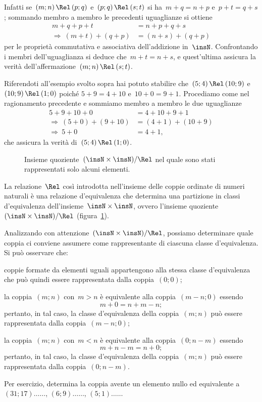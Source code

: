 Infatti se~$(m;n)\,\Rel\,(p;q)$ e~$(p;q)\,\Rel\,(s;t)$ si ha~$m+q = n+p$ e~$p+t = q+s$; sommando membro a membro le precedenti
uguaglianze si ottiene
\begin{align*}
 m+q + p+t &= n+p + q+s\\
 \Rightarrow\: (m+t)+(q+p) &= (n+s)+(q+p)
\end{align*}
per le proprietà commutativa e associativa dell'addizione in~$\insN$. Confrontando i membri dell'uguaglianza si deduce che~$m+t = n+s$,
e quest'ultima assicura la verità dell'affermazione~$(m;n)\,\Rel\,(s;t)$.

Riferendoti all'esempio svolto sopra hai potuto stabilire che~$(5;4)\,\Rel\,(10;9)$ e~$(10;9)\,\Rel \,(1;0)$
poiché $5+9=4+10$ e~$10+0=9+1$. Procediamo come nel ragionamento precedente e sommiamo membro a membro le due uguaglianze
\begin{align*}
 5+9+10+0 &= 4+10+9+1\\
\Rightarrow\: (5+0)+(9+10) &= (4+1)+(10+9)\\
\Rightarrow\: 5+0 &= 4+1\text{,}
\end{align*}
che assicura la verità di~$(5;4)\,\Rel\,(1;0)$.%

\begin{figure}[t]
 \centering
 \caption{Insieme quoziente~$(\insN\times\insN)/\Rel$ nel quale sono stati rappresentati solo alcuni elementi.}\label{fig:E.2}
\end{figure}

\conclusione La relazione~$\Rel$ così introdotta nell'insieme delle coppie ordinate di numeri naturali è una relazione d'equivalenza che determina
una partizione in classi d'equivalenza dell'insieme~$\insN\times\insN$, ovvero l'insieme quoziente $(\insN\times\insN)/\Rel$ (figura~\ref{fig:E.2}).

Analizzando con attenzione~$(\insN\times\insN)/\Rel$, possiamo determinare quale coppia ci conviene assumere come rappresentante di ciascuna classe
d'equivalenza. Si può osservare che:
\begin{itemize*}
\item coppie formate da elementi uguali appartengono alla stessa classe d'equivalenza che può quindi essere rappresentata dalla coppia~$(0;0)$;
\item la coppia~$(m;n)$ con~$m>n$ è equivalente alla coppia~$(m-n;0)$ essendo
\[m+0 = n+m-n;\]
pertanto, in tal caso, la classe d'equivalenza della coppia~$(m;n)$ può essere rappresentata dalla coppia~$(m-n;0)$;
\item la coppia~$(m;n)$ con~$m<n$ è equivalente alla coppia~$(0; n-m)$ essendo
\[m+n-m = n+0;\]
pertanto, in tal caso, la classe d'equivalenza della coppia~$(m;n)$ può essere rappresentata dalla coppia~$(0;n-m)$.
\end{itemize*}
Per esercizio, determina la coppia avente un elemento nullo ed equivalente a~$(31;17)\ldots\ldots$, $(6;9)\ldots\ldots$, $(5;1)\ldots\ldots$

